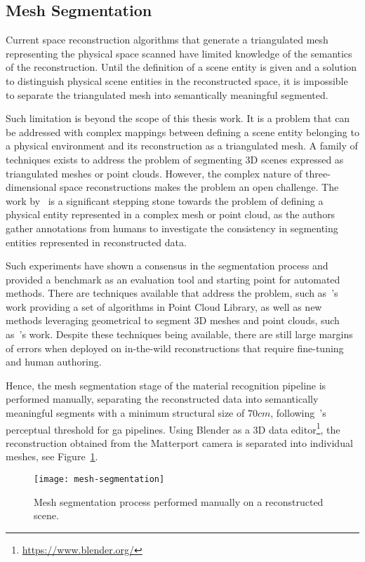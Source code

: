 \subsection{Mesh Segmentation}
Current space reconstruction algorithms that generate a triangulated mesh representing the physical space scanned have limited knowledge of the semantics of the reconstruction. Until the definition of a scene entity is given and a solution to distinguish physical scene entities in the reconstructed space, it is impossible to separate the triangulated mesh into semantically meaningful segmented.\par
Such limitation is beyond the scope of this thesis work. It is a problem that can be addressed with complex mappings between defining a scene entity belonging to a physical environment and its reconstruction as a triangulated mesh. A family of techniques exists to address the problem of segmenting 3D scenes expressed as triangulated meshes or point clouds. However, the complex nature of three-dimensional space reconstructions makes the problem an open challenge. The work by~\cite{chen2009benchmark} is a significant stepping stone towards the problem of defining a physical entity represented in a complex mesh or point cloud, as the authors gather annotations from humans to investigate the consistency in segmenting entities represented in reconstructed data.\par
Such experiments have shown a consensus in the segmentation process and provided a benchmark as an evaluation tool and starting point for automated methods. There are techniques available that address the problem, such as~\cite{rusu2011pcl}'s work providing a set of algorithms in Point Cloud Library, as well as new methods leveraging geometrical  to segment 3D meshes and point clouds, such as~\cite{feng2020semantic3d}'s work. Despite these techniques being available, there are still large margins of errors when deployed on in-the-wild reconstructions that require fine-tuning and human authoring.\par
Hence, the mesh segmentation stage of the material recognition pipeline is performed manually, separating the reconstructed data into semantically meaningful segments with a minimum structural size of $70cm$, following~\cite{pelzer2010frequency}'s perceptual threshold for \acrshort{ga} pipelines. Using Blender as a 3D data editor\footnote{\url{https://www.blender.org/}}, the reconstruction obtained from the Matterport camera is separated into individual meshes, see Figure~\ref{fig:mesh-segmentation}.\par
\begin{figure}
    \centering
    \texttt{[image: mesh-segmentation]}
    \caption{Mesh segmentation process performed manually on a reconstructed scene.}
    \label{fig:mesh-segmentation}
\end{figure}

